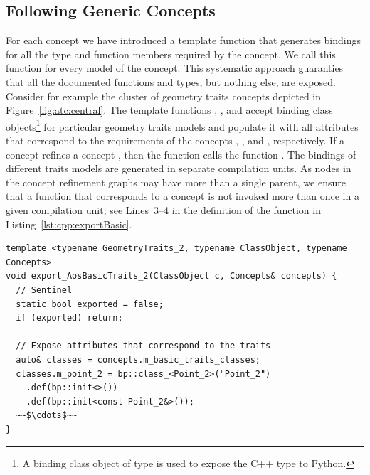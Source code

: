 \subsection{Following Generic Concepts}
\label{sec:code:concepts}
For each concept we have introduced a template function that generates
bindings for all the type and function members required by the
concept. We call this function for every model of the concept. This
systematic approach guaranties that all the documented functions and
types, but nothing else, are exposed. Consider for example the cluster
of geometry traits concepts depicted in
Figure~\ref{fig:atc:central}. The template functions
,
, and
 accept binding class
objects\footnote{A binding class object of type
   is used to expose the C++ type
   to Python.} for particular geometry traits models
and populate it with all attributes that correspond to the
requirements of the concepts ,
, and ,
respectively. If a concept  refines a concept
, then the function  calls
the function . The bindings of different
traits models are generated in separate compilation units. As nodes in
the concept refinement graphs may have more than a single parent, we
ensure that a function that corresponds to a concept is not invoked
more than once in a given compilation unit; see Lines~3--4 in the
definition of the function 
in Listing~\ref{lst:cpp:exportBasic}.

\begin{lstfloat}
  \begin{lstlisting}[style=cppFramedStyle,basicstyle=\normalsize,%
                     label={lst:cpp:exportBasic},%
                     caption={Exposing attributes that correspond to the concept \cppLstinline{AosBasicTraits_2}.}]
template <typename GeometryTraits_2, typename ClassObject, typename Concepts>
void export_AosBasicTraits_2(ClassObject c, Concepts& concepts) {
  // Sentinel
  static bool exported = false;
  if (exported) return;

  // Expose attributes that correspond to the traits
  auto& classes = concepts.m_basic_traits_classes;
  classes.m_point_2 = bp::class_<Point_2>("Point_2")
    .def(bp::init<>())
    .def(bp::init<const Point_2&>());
  ~~$\cdots$~~
}
  \end{lstlisting}
\end{lstfloat}

